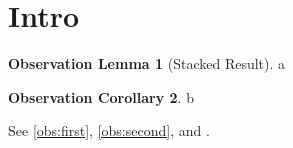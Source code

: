 \documentclass[twocolumn,unicode]{wrapper}
\begin{document}
\wrapperclass\articleclass\layoutmode\hypermode
\theoremstyle{definition}
\swapnumbers
\newtheorem{oblemma}{Observation Lemma}[section]
\newtheorem{obcor}[oblemma]{Observation Corollary}
\section{Intro}
\begin{oblemma}[Stacked Result]\label{obs:first}
a
\end{oblemma}
\begin{obcor}\label{obs:second}
b
\end{obcor}
See \autoref{obs:first}, \autoref{obs:second}, and .
\end{document}
